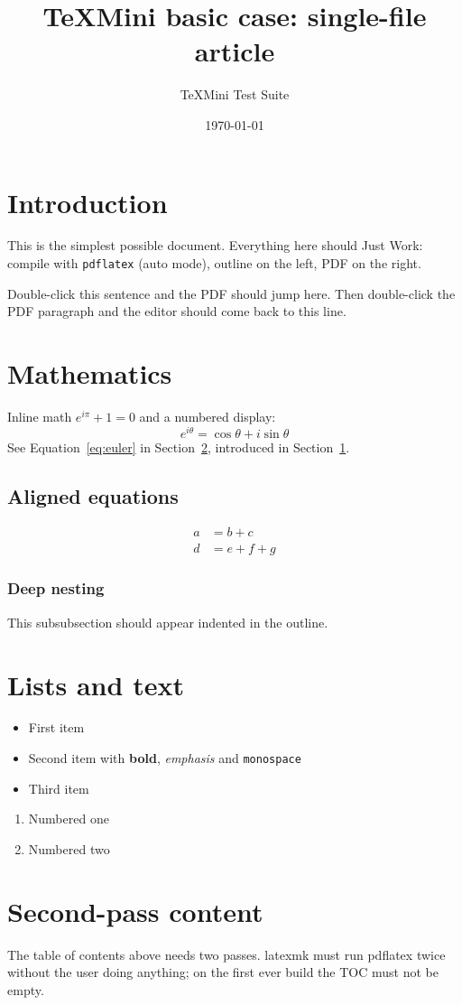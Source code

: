 \documentclass[11pt]{article}
\title{TeXMini basic case: single-file article}
\author{TeXMini Test Suite}
\date{\today}
\begin{document}
\maketitle
\tableofcontents

\section{Introduction}\label{sec:intro}
This is the simplest possible document. Everything here should Just Work:
compile with \texttt{pdflatex} (auto mode), outline on the left, PDF on the right.

Double-click this sentence and the PDF should jump here. Then double-click the
PDF paragraph and the editor should come back to this line.

\section{Mathematics}\label{sec:math}
Inline math $e^{i\pi} + 1 = 0$ and a numbered display:
\begin{equation}\label{eq:euler}
  e^{i\theta} = \cos\theta + i\sin\theta
\end{equation}
See Equation~\eqref{eq:euler} in Section~\ref{sec:math}, introduced in Section~\ref{sec:intro}.

\subsection{Aligned equations}
\begin{align}
  a &= b + c \\
  d &= e + f + g \label{eq:second}
\end{align}

\subsubsection{Deep nesting}
This subsubsection should appear indented in the outline.

\section{Lists and text}
\begin{itemize}
  \item First item
  \item Second item with \textbf{bold}, \emph{emphasis} and \texttt{monospace}
  \item Third item
\end{itemize}

\begin{enumerate}
  \item Numbered one
  \item Numbered two
\end{enumerate}

\section{Second-pass content}
The table of contents above needs two passes. latexmk must run pdflatex twice
without the user doing anything; on the first ever build the TOC must not be empty.
\end{document}
